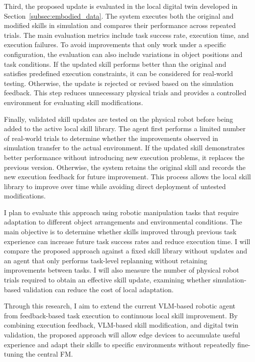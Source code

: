 \documentclass[11pt]{article}
\begin{document}
Third, the proposed update is evaluated in the local digital twin developed in Section~\ref{subsec:embodied_data}. The system executes both the original and modified skills in simulation and compares their performance across repeated trials. The main evaluation metrics include task success rate, execution time, and execution failures. To avoid improvements that only work under a specific configuration, the evaluation can also include variations in object positions and task conditions. If the updated skill performs better than the original and satisfies predefined execution constraints, it can be considered for real-world testing. Otherwise, the update is rejected or revised based on the simulation feedback. This step reduces unnecessary physical trials and provides a controlled environment for evaluating skill modifications.

Finally, validated skill updates are tested on the physical robot before being added to the active local skill library. The agent first performs a limited number of real-world trials to determine whether the improvements observed in simulation transfer to the actual environment. If the updated skill demonstrates better performance without introducing new execution problems, it replaces the previous version. Otherwise, the system retains the original skill and records the new execution feedback for future improvement. This process allows the local skill library to improve over time while avoiding direct deployment of untested modifications.

I plan to evaluate this approach using robotic manipulation tasks that require adaptation to different object arrangements and environmental conditions. The main objective is to determine whether skills improved through previous task experience can increase future task success rates and reduce execution time. I will compare the proposed approach against a fixed skill library without updates and an agent that only performs task-level replanning without retaining improvements between tasks. I will also measure the number of physical robot trials required to obtain an effective skill update, examining whether simulation-based validation can reduce the cost of local adaptation.

Through this research, I aim to extend the current VLM-based robotic agent from feedback-based task execution to continuous local skill improvement. By combining execution feedback, VLM-based skill modification, and digital twin validation, the proposed approach will allow edge devices to accumulate useful experience and adapt their skills to specific environments without repeatedly fine-tuning the central FM.
\end{document}

